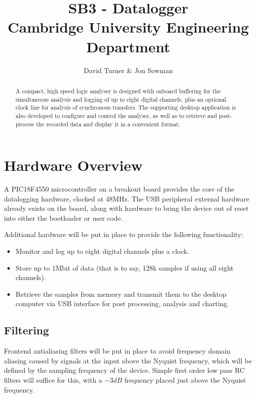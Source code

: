 \documentclass[11pt]{article}
\title{SB3 - Datalogger\\Cambridge University Engineering Department}
\author{David Turner \& Jon Sowman}
\begin{document}
    \maketitle
	
\begin{abstract}
    A compact, high speed logic analyser is designed with onboard buffering for
    the simultaneous analysis and logging of up to eight digital channels, plus
    an optional clock line for analysis of synchronous transfers. The supporting
    desktop application is also developed to configure and control the analyser,
    as well as to retrieve and post-process the recorded data and display it in
    a convenient format.
\end{abstract}

\section{Hardware Overview}
    A PIC18F4550 microcontroller on a breakout board provides the core of the
    datalogging hardware, clocked at 48MHz. The USB peripheral external hardware
    already exists on the board, along with hardware to bring the device out of
    reset into either the bootloader or user code.

    Additional hardware will be put in place to provide the following
    functionality:
    \begin{itemize}
    \item Monitor and log up to eight digital channels plus a clock.
    \item Store up to 1Mbit of data (that is to say, 128k samples if using all
    eight channels).
    \item Retrieve the samples from memory and transmit them to the desktop
    computer via USB interface for post processing, analysis and charting.
    \end{itemize}

\subsection{Filtering}
    Frontend antialiasing filters will be put in place to avoid frequency domain
    aliasing caused by signals at the input above the Nyquist frequency, which
    will be defined by the sampling frequency of the device. Simple first order
    low pass RC filters will suffice for this, with a $-3dB$ frequency placed
    just above the Nyquist frequency.
\end{document}
